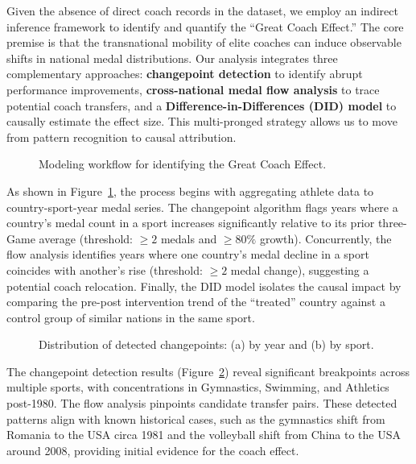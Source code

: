 \documentclass{mcmthesis}
\begin{document}
Given the absence of direct coach records in the dataset, we employ an indirect inference framework to identify and quantify the ``Great Coach Effect.'' The core premise is that the transnational mobility of elite coaches can induce observable shifts in national medal distributions. Our analysis integrates three complementary approaches: \textbf{changepoint detection} to identify abrupt performance improvements, \textbf{cross-national medal flow analysis} to trace potential coach transfers, and a \textbf{Difference-in-Differences (DID) model} to causally estimate the effect size. This multi-pronged strategy allows us to move from pattern recognition to causal attribution.

\begin{figure}[htbp]
    \centering
    \caption{Modeling workflow for identifying the Great Coach Effect.}
    \label{fig:q2_workflow}
\end{figure}

As shown in Figure~\ref{fig:q2_workflow}, the process begins with aggregating athlete data to country-sport-year medal series. The changepoint algorithm flags years where a country's medal count in a sport increases significantly relative to its prior three-Game average (threshold: $\geq 2$ medals and $\geq 80\%$ growth). Concurrently, the flow analysis identifies years where one country's medal decline in a sport coincides with another's rise (threshold: $\geq 2$ medal change), suggesting a potential coach relocation. Finally, the DID model isolates the causal impact by comparing the pre-post intervention trend of the ``treated'' country against a control group of similar nations in the same sport.

\begin{figure}[htbp]
    \centering
    \caption{Distribution of detected changepoints: (a) by year and (b) by sport.}
    \label{fig:changepoint}
\end{figure}

The changepoint detection results (Figure~\ref{fig:changepoint}) reveal significant breakpoints across multiple sports, with concentrations in Gymnastics, Swimming, and Athletics post-1980. The flow analysis pinpoints candidate transfer pairs. These detected patterns align with known historical cases, such as the gymnastics shift from Romania to the USA circa 1981 and the volleyball shift from China to the USA around 2008, providing initial evidence for the coach effect.
\end{document}
